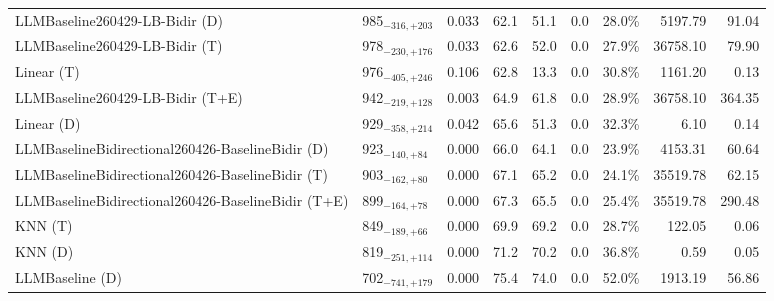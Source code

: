 \begin{tabular}{llcccccrr}
LLMBaseline260429-LB-Bidir (D) & 985${}_{-316,+203}$ & 0.033 & 62.1 & 51.1 & 0.0 & 28.0\% & 5197.79 & 91.04 \\
LLMBaseline260429-LB-Bidir (T) & 978${}_{-230,+176}$ & 0.033 & 62.6 & 52.0 & 0.0 & 27.9\% & 36758.10 & 79.90 \\
Linear (T) & 976${}_{-405,+246}$ & 0.106 & 62.8 & 13.3 & 0.0 & 30.8\% & 1161.20 & 0.13 \\
LLMBaseline260429-LB-Bidir (T+E) & 942${}_{-219,+128}$ & 0.003 & 64.9 & 61.8 & 0.0 & 28.9\% & 36758.10 & 364.35 \\
Linear (D) & 929${}_{-358,+214}$ & 0.042 & 65.6 & 51.3 & 0.0 & 32.3\% & 6.10 & 0.14 \\
LLMBaselineBidirectional260426-BaselineBidir (D) & 923${}_{-140,+84}$ & 0.000 & 66.0 & 64.1 & 0.0 & 23.9\% & 4153.31 & 60.64 \\
LLMBaselineBidirectional260426-BaselineBidir (T) & 903${}_{-162,+80}$ & 0.000 & 67.1 & 65.2 & 0.0 & 24.1\% & 35519.78 & 62.15 \\
LLMBaselineBidirectional260426-BaselineBidir (T+E) & 899${}_{-164,+78}$ & 0.000 & 67.3 & 65.5 & 0.0 & 25.4\% & 35519.78 & 290.48 \\
KNN (T) & 849${}_{-189,+66}$ & 0.000 & 69.9 & 69.2 & 0.0 & 28.7\% & 122.05 & 0.06 \\
KNN (D) & 819${}_{-251,+114}$ & 0.000 & 71.2 & 70.2 & 0.0 & 36.8\% & 0.59 & 0.05 \\
LLMBaseline (D) & 702${}_{-741,+179}$ & 0.000 & 75.4 & 74.0 & 0.0 & 52.0\% & 1913.19 & 56.86 \\
\bottomrule
\end{tabular}